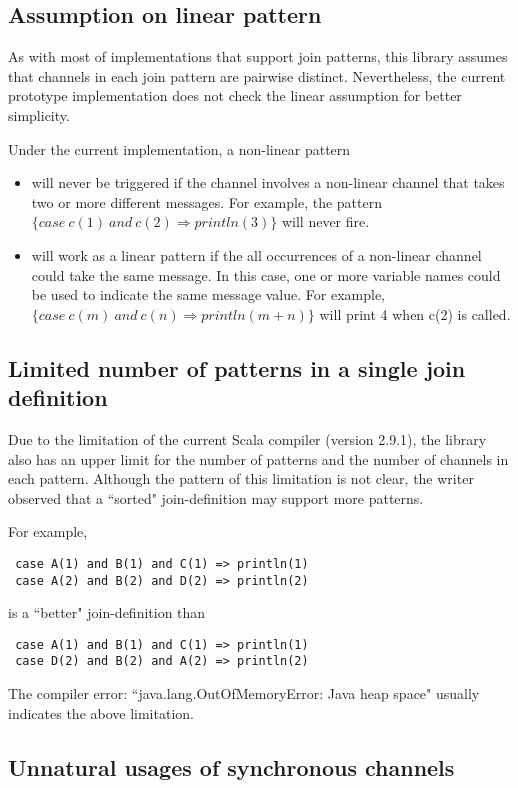 \subsection{Assumption on linear pattern}
As with most of implementations that support join patterns, this library assumes that channels in each join pattern are pairwise distinct.  Nevertheless, the current prototype implementation does not check the linear assumption for better simplicity.  

Under the current implementation, a non-linear pattern
\begin{itemize}
\item will never be triggered if the channel involves a non-linear channel that takes two or more different messages.  For example, the pattern $\{case\  c(1)\ and\ c(2) \Rightarrow println(3)\}$ will never fire.
\item will work as a linear pattern if the all occurrences of a non-linear channel could take the same message.  In this case, one or more variable names could be used to indicate the same message value.  For example,  $\{case\  c(m)\ and\ c(n) \Rightarrow println(m+n)\}$ will print 4 when c(2) is called.
\end{itemize}

\subsection{Limited number of patterns in a single join definition}
Due to the limitation of the current Scala compiler (version 2.9.1), the library also has an upper limit for the number of patterns and the number of channels in each pattern.  Although the pattern of this limitation is not clear, the writer observed that a ``sorted" join-definition may support more patterns.

For example,
\begin{lstlisting}
 case A(1) and B(1) and C(1) => println(1)
 case A(2) and B(2) and D(2) => println(2)
\end{lstlisting}
is a ``better" join-definition than
\begin{lstlisting}
 case A(1) and B(1) and C(1) => println(1)
 case D(2) and B(2) and A(2) => println(2)
\end{lstlisting}
The compiler error: ``java.lang.OutOfMemoryError: Java heap space" usually indicates the above limitation.

\newpage

\subsection{Unnatural usages of synchronous channels}

